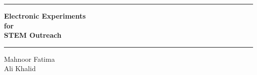

\newcommand{\thesisAuthor}{Mahnoor Fatima}
\newcommand{\thesisTitle}{Electronic Experiments for STEM Outreach}
\newcommand{\thesisSubTitle}{little bit more descriptive}
\newcommand{\thesisTitleTranslated}{Translated Headline}
\newcommand{\thesisDegree}{Master thesis project}
\newcommand{\university}{Swedish University of Argicultural Science, SLU}
\newcommand{\credits}{30 hp}
\newcommand{\faculty}{Faculty of blablabalba}
\newcommand{\thesisPlaceDate}{Place of puplication, Year}
\newcommand{\company}{Company name}

\begin{titlepage}
\thispagestyle{empty}

\hspace{2cm}
\centering
\vspace{3cm}
\par
\noindent
\Huge
\rule[0.3cm]{\linewidth}{2pt}
\textbf{Electronic Experiments \\for \\STEM Outreach}\\
\vspace{0.2cm}
\rule[0.3cm]{\linewidth}{2pt}
\Large

\vspace{8cm}

\noindent
\LARGE
\thesisAuthor\\
Ali Khalid\\
\end{titlepage}
